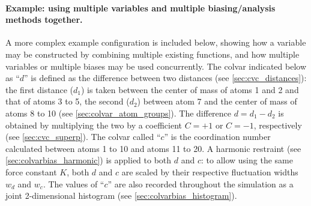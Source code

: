 \paragraph*{Example: using multiple variables and multiple biasing/analysis methods together.}

A more complex example configuration is included below, showing how a variable may be constructed by combining multiple existing functions, and how multiple variables or multiple biases may be used concurrently.
The colvar indicated below as ``$d$'' is defined as the difference between two distances (see \ref{sec:cvc_distances}): the first distance ($d_{1}$) is taken between the center of mass of atoms 1 and 2 and that of atoms 3 to 5, the second ($d_{2}$) between atom 7 and the center of mass of atoms 8 to 10 (see \ref{sec:colvar_atom_groups}).
The difference $d = d_{1} - d_{2}$ is obtained by multiplying the two by a coefficient $C = +1$ or $C = -1$, respectively (see \ref{sec:cvc_superp}).
The colvar called ``$c$'' is the coordination number calculated between atoms 1 to 10 and atoms 11 to 20.  A harmonic restraint (see \ref{sec:colvarbias_harmonic}) is applied to both $d$ and $c$: to allow using the same force constant $K$, both $d$ and $c$ are scaled by their respective fluctuation widths $w_d$ and $w_c$.
The values of ``$c$'' are also recorded throughout the simulation as a joint 2-dimensional histogram (see \ref{sec:colvarbias_histogram}).

